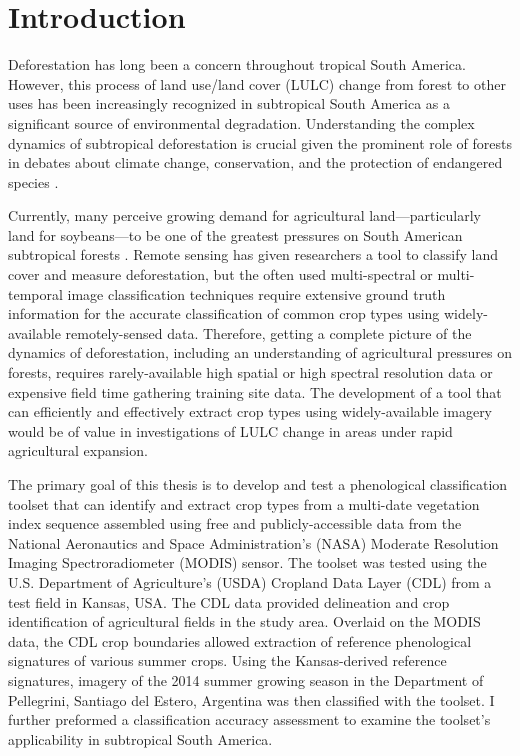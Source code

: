 \chapter{Introduction}
\label{intro}

Deforestation has long been a concern throughout tropical South America. However, this process of land use/land cover (LULC) change from forest to other uses has been increasingly recognized in subtropical South America as a significant source of environmental degradation. Understanding the complex dynamics of subtropical deforestation is crucial given the prominent role of forests in debates about climate change, conservation, and the protection of endangered species \autocites{geist2002proximate}{zak2004do-subtropical}{bonnie2000counting}{houghton1994the-worldwide}{sala2000global}.

Currently, many perceive growing demand for agricultural land---particularly land for soybeans---to be one of the greatest pressures on South American subtropical forests \autocites{pengue2005transgenic}{grau2005agriculture}{altieri2006gm-soybean:}. Remote sensing has given researchers a tool to classify land cover and measure deforestation, but the often used multi-spectral or multi-temporal image classification techniques require extensive ground truth information for the accurate classification of common crop types using widely-available remotely-sensed data. Therefore, getting a complete picture of the dynamics of deforestation, including an understanding of agricultural pressures on forests, requires rarely-available high spatial or high spectral resolution data \autocite{senay2000using} or expensive field time gathering training site data. The development of a tool that can efficiently and effectively extract crop types using widely-available imagery would be of value in investigations of LULC change in areas under rapid agricultural expansion.

The primary goal of this thesis is to develop and test a phenological classification toolset that can identify and extract crop types from a multi-date vegetation index sequence assembled using free and publicly-accessible data from the National Aeronautics and Space Administration’s (NASA) Moderate Resolution Imaging Spectroradiometer (MODIS) sensor. The toolset was tested using the U.S. Department of Agriculture's (USDA) Cropland Data Layer (CDL) from a test field in Kansas, USA. The CDL data provided delineation and crop identification of agricultural fields in the study area. Overlaid on the MODIS data, the CDL crop boundaries allowed extraction of reference phenological signatures of various summer crops. Using the Kansas-derived reference signatures, imagery of the 2014 summer growing season in the Department of Pellegrini, Santiago del Estero, Argentina was then classified with the toolset. I further preformed a classification accuracy assessment to examine the toolset's applicability in subtropical South America.

